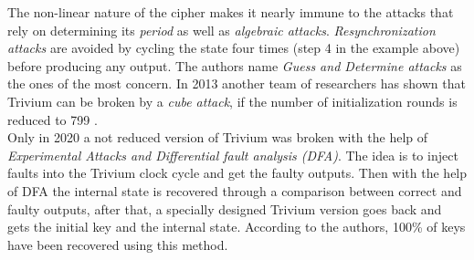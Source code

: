 The non-linear nature of the cipher makes it nearly immune to the attacks that rely on determining its \emph{period} as well as \emph{algebraic attacks}. \emph{Resynchronization attacks} are avoided by cycling the state four times (step 4 in the example above) before producing any output. The authors name \emph{Guess and Determine attacks} as the ones of the most concern. In 2013 another team of researchers has shown that Trivium can be broken by a \emph{cube attack}, if the number of initialization rounds is reduced to 799 \cite{fouque2013improving}. \\

Only in 2020 \cite{potestad2020breaking} a not reduced version of Trivium was broken with the help of \emph{Experimental Attacks and Differential fault analysis (DFA)}. The idea is to inject faults into the Trivium clock cycle and get the faulty outputs. Then with the help of DFA the internal state is recovered through a comparison between correct and faulty outputs, after that, a specially designed Trivium version goes back and gets the initial key and the internal state. According to the authors, 100\% of keys have been recovered using this method.

